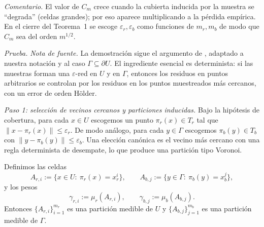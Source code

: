 \noindent\emph{Comentario.}
El valor de $C_m$ crece cuando la cubierta inducida por la muestra se ``degrada'' (celdas grandes);
por eso aparece multiplicando a la pérdida empírica. En el cierre del Teorema~1 se escoge
$\varepsilon_r,\varepsilon_b$ como funciones de $m_r,m_b$ de modo que $C_m$ sea del orden $m^{1/2}$.

\medskip


\noindent\emph{Prueba.}
\emph{Nota de fuente.}
La demostración sigue el argumento de \cite[Lemma~B.1]{shin2020convergence}, adaptado a nuestra notación y al caso
$\Gamma\subseteq\partial U$. El ingrediente esencial es determinista: si las muestras forman una $\varepsilon$-red en $U$ y en $\Gamma$,
entonces los residuos en puntos arbitrarios se controlan por los residuos en los puntos muestreados más cercanos, con un error de orden Hölder.

\smallskip
\textit{Paso 1: selección de vecinos cercanos y particiones inducidas.}
Bajo la hipótesis de cobertura, para cada $x\in U$ escogemos un punto $\pi_r(x)\in T_r$ tal que $\|x-\pi_r(x)\|\le \varepsilon_r$.
De modo análogo, para cada $y\in\Gamma$ escogemos $\pi_b(y)\in T_b$ con $\|y-\pi_b(y)\|\le \varepsilon_b$.
Una elección canónica es el vecino más cercano con una regla determinista de desempate, lo que produce una partición tipo Voronoi.

Definimos las celdas
\[
A_{r,i}:=\{x\in U:\ \pi_r(x)=x_r^i\},\qquad
A_{b,j}:=\{y\in\Gamma:\ \pi_b(y)=x_b^j\},
\]
y los pesos
\[
\gamma_{r,i}:=\mu_r(A_{r,i}),\qquad \gamma_{b,j}:=\mu_b(A_{b,j}).
\]
Entonces $\{A_{r,i}\}_{i=1}^{m_r}$ es una partición medible de $U$ y $\{A_{b,j}\}_{j=1}^{m_b}$ es una partición medible de $\Gamma$.

